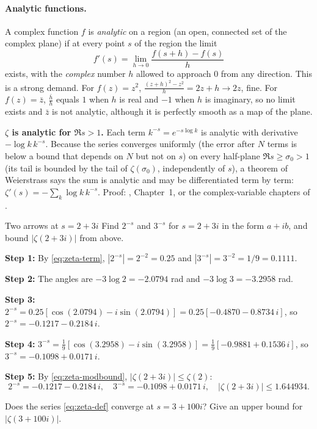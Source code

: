 \paragraph{Analytic functions.} A complex function $f$ is \emph{analytic} on a region (an open, connected set of the complex plane) if at every point $s$ of the region the limit
\[
f'(s)=\lim_{h\to0}\frac{f(s+h)-f(s)}{h}
\]
exists, with the \emph{complex} number $h$ allowed to approach $0$ from any direction. This is a strong demand. For $f(z)=z^2$, $\frac{(z+h)^2-z^2}{h}=2z+h\to2z$, fine. For $f(z)=\bar z$, $\frac{\bar h}{h}$ equals $1$ when $h$ is real and $-1$ when $h$ is imaginary, so no limit exists and $\bar z$ is not analytic, although it is perfectly smooth as a map of the plane.

\begin{beyond}
\textbf{$\zeta$ is analytic for $\Re s>1$.} Each term $k^{-s}=e^{-s\log k}$ is analytic with derivative $-\log k\,k^{-s}$. Because the series converges uniformly (the error after $N$ terms is below a bound that depends on $N$ but not on $s$) on every half-plane $\Re s\ge\sigma_0>1$ (its tail is bounded by the tail of $\zeta(\sigma_0)$, independently of $s$), a theorem of Weierstrass says the sum is analytic and may be differentiated term by term: $\zeta'(s)=-\sum_k \log k\,k^{-s}$. Proof: \cite{titchmarsh}, Chapter~1, or the complex-variable chapters of \cite{rhb}.
\end{beyond}

\begin{sample}{Two arrows at $s=2+3i$}
Find $2^{-s}$ and $3^{-s}$ for $s=2+3i$ in the form $a+ib$, and bound $|\zeta(2+3i)|$ from above.

\textbf{Step 1:} By \cref{eq:zeta-term}, $|2^{-s}|=2^{-2}=0.25$ and $|3^{-s}|=3^{-2}=1/9=0.1111$.

\textbf{Step 2:} The angles are $-3\log2=-2.0794$ rad and $-3\log3=-3.2958$ rad.

\textbf{Step 3:} $2^{-s}=0.25[\cos(2.0794)-i\sin(2.0794)]=0.25[-0.4870-0.8734\,i]$, so $2^{-s}=-0.1217-0.2184\,i$.

\textbf{Step 4:} $3^{-s}=\tfrac19[\cos(3.2958)-i\sin(3.2958)]=\tfrac19[-0.9881+0.1536\,i]$, so $3^{-s}=-0.1098+0.0171\,i$.

\textbf{Step 5:} By \cref{eq:zeta-modbound}, $|\zeta(2+3i)|\le\zeta(2)$:
\[
\boxed{2^{-s}=-0.1217-0.2184\,i,\quad 3^{-s}=-0.1098+0.0171\,i,\quad |\zeta(2+3i)|\le1.644934.}
\]
\end{sample}

\begin{checkpoint}
Does the series \cref{eq:zeta-def} converge at $s=3+100i$? Give an upper bound for $|\zeta(3+100i)|$.
\end{checkpoint}


